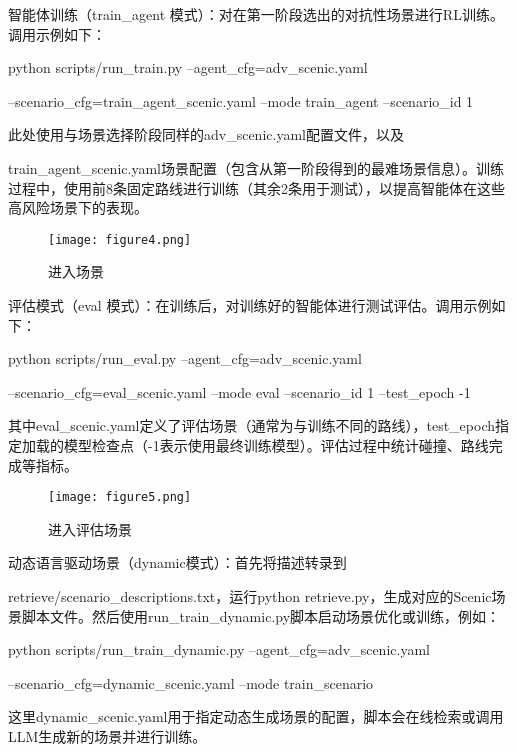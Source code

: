 智能体训练（train\_agent 模式）：对在第一阶段选出的对抗性场景进行RL训练。调用示例如下：

python scripts/run\_train.py --agent\_cfg=adv\_scenic.yaml

--scenario\_cfg=train\_agent\_scenic.yaml --mode train\_agent --scenario\_id 1

此处使用与场景选择阶段同样的adv\_scenic.yaml配置文件，以及

train\_agent\_scenic.yaml场景配置（包含从第一阶段得到的最难场景信息）。训练过程中，使用前8条固定路线进行训练（其余2条用于测试），以提高智能体在这些高风险场景下的表现。


\begin{figure}[htbp]
	\centering
	\texttt{[image: figure4.png]} %
	\caption{进入场景} %
	\label{fig:example} %
\end{figure}



评估模式（eval 模式）：在训练后，对训练好的智能体进行测试评估。调用示例如下：

python scripts/run\_eval.py --agent\_cfg=adv\_scenic.yaml

--scenario\_cfg=eval\_scenic.yaml --mode eval --scenario\_id 1 --test\_epoch -1

其中eval\_scenic.yaml定义了评估场景（通常为与训练不同的路线），test\_epoch指定加载的模型检查点（-1表示使用最终训练模型）。评估过程中统计碰撞、路线完成等指标。



\begin{figure}[htbp]
	\centering
	\texttt{[image: figure5.png]} %
	\caption{进入评估场景} %
	\label{fig:example} %
\end{figure}



动态语言驱动场景（dynamic模式）：首先将描述转录到

retrieve/scenario\_descriptions.txt，运行python retrieve.py，生成对应的Scenic场景脚本文件。然后使用run\_train\_dynamic.py脚本启动场景优化或训练，例如：

python scripts/run\_train\_dynamic.py --agent\_cfg=adv\_scenic.yaml

--scenario\_cfg=dynamic\_scenic.yaml --mode train\_scenario

这里dynamic\_scenic.yaml用于指定动态生成场景的配置，脚本会在线检索或调用LLM生成新的场景并进行训练。


